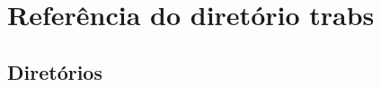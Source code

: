 \section{Referência do diretório trabs}
\label{dir_5c8734657695d35438cb9c2dde7bf247}
\subsection*{Diretórios}
\begin{DoxyCompactItemize}
\end{DoxyCompactItemize}
